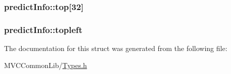 \label{structpredict_info_aaec86d32b8769dabe17f60051a792e19}
\hypertarget{structpredict_info_ab44f7aab3b6e76f7be44d5420f5f4407}{
\subsubsection[{top}]{ {\bf predictInfo::top}\mbox{[}32\mbox{]}}}
\label{structpredict_info_ab44f7aab3b6e76f7be44d5420f5f4407}
\hypertarget{structpredict_info_a2f363beeef9ca2f90a0db2259fc88f7b}{
\subsubsection[{topleft}]{ {\bf predictInfo::topleft}}}
\label{structpredict_info_a2f363beeef9ca2f90a0db2259fc88f7b}


The documentation for this struct was generated from the following file:\begin{DoxyCompactItemize}
\item 
MVCCommonLib/\hyperlink{_types_8h}{Types.h}\end{DoxyCompactItemize}
